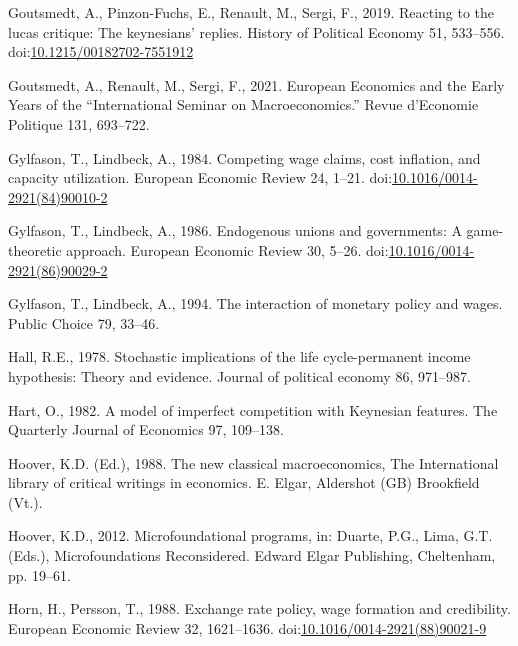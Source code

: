 \documentclass[]{elsarticle} %
\newlength{\cslhangindent}
\newlength{\cslentryspacingunit} %
\newenvironment{CSLReferences}[2] %
 {%
  \setlength{\parindent}{0pt}
  \ifodd #1
  \let\oldpar\par
  \def\par{\hangindent=\cslhangindent\oldpar}
  \fi
  \setlength{\parskip}{#2\cslentryspacingunit}
 }%
 {}
\begin{document}
\begin{CSLReferences}{1}{0}
\leavevmode{}%
Goutsmedt, A., Pinzon-Fuchs, E., Renault, M., Sergi, F., 2019. Reacting
to the lucas critique: {The} keynesians' replies. History of Political
Economy 51, 533--556.
doi:\href{https://doi.org/10.1215/00182702-7551912}{10.1215/00182702-7551912}

\leavevmode{}%
Goutsmedt, A., Renault, M., Sergi, F., 2021. European {Economics} and
the {Early Years} of the {``{International Seminar} on
{Macroeconomics}.''} Revue d'Economie Politique 131, 693--722.

\leavevmode{}%
Gylfason, T., Lindbeck, A., 1984. Competing wage claims, cost inflation,
and capacity utilization. European Economic Review 24, 1--21.
doi:\href{https://doi.org/10.1016/0014-2921(84)90010-2}{10.1016/0014-2921(84)90010-2}

\leavevmode{}%
Gylfason, T., Lindbeck, A., 1986. Endogenous unions and governments: {A}
game-theoretic approach. European Economic Review 30, 5--26.
doi:\href{https://doi.org/10.1016/0014-2921(86)90029-2}{10.1016/0014-2921(86)90029-2}

\leavevmode{}%
Gylfason, T., Lindbeck, A., 1994. The interaction of monetary policy and
wages. Public Choice 79, 33--46.

\leavevmode{}%
Hall, R.E., 1978. Stochastic implications of the life cycle-permanent
income hypothesis: Theory and evidence. Journal of political economy 86,
971--987.

\leavevmode{}%
Hart, O., 1982. A model of imperfect competition with {Keynesian}
features. The Quarterly Journal of Economics 97, 109--138.

\leavevmode{}%
Hoover, K.D. (Ed.), 1988. The new classical macroeconomics, The
{International} library of critical writings in economics. E. Elgar,
Aldershot (GB) Brookfield (Vt.).

\leavevmode{}%
Hoover, K.D., 2012. Microfoundational programs, in: Duarte, P.G., Lima,
G.T. (Eds.), Microfoundations {Reconsidered}. Edward Elgar Publishing,
Cheltenham, pp. 19--61.

\leavevmode{}%
Horn, H., Persson, T., 1988. Exchange rate policy, wage formation and
credibility. European Economic Review 32, 1621--1636.
doi:\href{https://doi.org/10.1016/0014-2921(88)90021-9}{10.1016/0014-2921(88)90021-9}


\end{CSLReferences}
\end{document}
